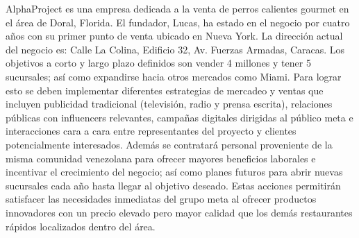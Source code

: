 
AlphaProject es una empresa dedicada a la venta de perros calientes gourmet en el área de Doral, Florida. El fundador, Lucas, ha estado en el negocio por cuatro años con su primer punto de venta ubicado en Nueva York. La dirección actual del negocio es: Calle La Colina, Edificio 32, Av. Fuerzas Armadas, Caracas. Los objetivos a corto y largo plazo definidos son vender 4 millones y tener 5 sucursales; así como expandirse hacia otros mercados como Miami. Para lograr esto se deben implementar diferentes estrategias de mercadeo y ventas que incluyen publicidad tradicional (televisión, radio y prensa escrita), relaciones públicas con influencers relevantes, campañas digitales dirigidas al público meta e interacciones cara a cara entre representantes del proyecto y clientes potencialmente interesados. Además se contratará personal proveniente de la misma comunidad venezolana para ofrecer mayores beneficios laborales e incentivar el crecimiento del negocio; así como planes futuros para abrir nuevas sucursales cada año hasta llegar al objetivo deseado. Estas acciones permitirán satisfacer las necesidades inmediatas del grupo meta al ofrecer productos innovadores con un precio elevado pero mayor calidad que los demás restaurantes rápidos localizados dentro del área.
